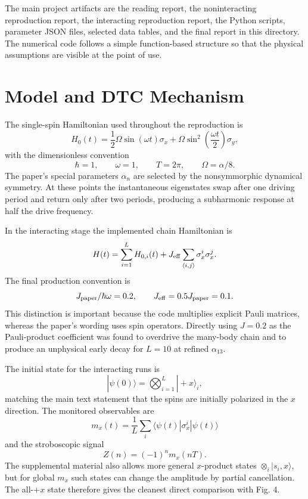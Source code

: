\documentclass[aps,pra,preprint,superscriptaddress,nofootinbib]{revtex4-2}
\begin{document}
The main project artifacts are the reading report, the noninteracting reproduction report, the interacting reproduction report, the Python scripts, parameter JSON files, selected data tables, and the final report in this directory. The numerical code follows a simple function-based structure so that the physical assumptions are visible at the point of use.

\section{Model and DTC Mechanism}

The single-spin Hamiltonian used throughout the reproduction is
\begin{equation}
H_0(t)=\frac{1}{2}\Omega\sin(\omega t)\sigma_x+
\Omega\sin^2\left(\frac{\omega t}{2}\right)\sigma_y,
\label{eq:h0}
\end{equation}
with the dimensionless convention
\begin{equation}
\hbar=1,\qquad \omega=1,\qquad T=2\pi,\qquad
\Omega=\alpha/8.
\end{equation}
The paper's special parameters \(\alpha_n\) are selected by the nonsymmorphic dynamical symmetry. At these points the instantaneous eigenstates swap after one driving period and return only after two periods, producing a subharmonic response at half the drive frequency.

In the interacting stage the implemented chain Hamiltonian is
\begin{equation}
H(t)=\sum_{i=1}^{L}H_{0,i}(t)
+J_{\rm eff}\sum_{\langle i,j\rangle}\sigma_x^i\sigma_x^j.
\label{eq:hint}
\end{equation}
The final production convention is
\begin{equation}
J_{\rm paper}/\hbar\omega=0.2,\qquad
J_{\rm eff}=0.5J_{\rm paper}=0.1.
\label{eq:jconv}
\end{equation}
This distinction is important because the code multiplies explicit Pauli matrices, whereas the paper's wording uses spin operators. Directly using \(J=0.2\) as the Pauli-product coefficient was found to overdrive the many-body chain and to produce an unphysical early decay for \(L=10\) at refined \(\alpha_{13}\).

The initial state for the interacting runs is
\begin{equation}
|\psi(0)\rangle=\bigotimes_{i=1}^{L}|+x\rangle_i,
\end{equation}
matching the main text statement that the spins are initially polarized in the \(x\) direction. The monitored observables are
\begin{equation}
m_x(t)=\frac{1}{L}\sum_i
\langle \psi(t)|\sigma_x^i|\psi(t)\rangle
\end{equation}
and the stroboscopic signal
\begin{equation}
Z(n)=(-1)^n m_x(nT).
\end{equation}
The supplemental material also allows more general \(x\)-product states
\(\otimes_i |s_i,x\rangle\), but for global \(m_x\) such states can change the amplitude by partial cancellation. The all-\(+x\) state therefore gives the cleanest direct comparison with Fig. 4.
\end{document}
